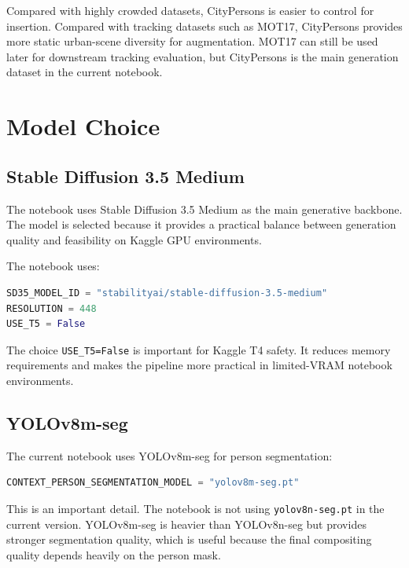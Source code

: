 \documentclass[12pt,a4paper]{article}
\begin{document}
Compared with highly crowded datasets, CityPersons is easier to control for
insertion. Compared with tracking datasets such as MOT17, CityPersons provides
more static urban-scene diversity for augmentation. MOT17 can still be used
later for downstream tracking evaluation, but CityPersons is the main generation
dataset in the current notebook.

\section{Model Choice}

\subsection{Stable Diffusion 3.5 Medium}

The notebook uses Stable Diffusion 3.5 Medium as the main generative backbone.
The model is selected because it provides a practical balance between generation
quality and feasibility on Kaggle GPU environments.

The notebook uses:

\begin{lstlisting}[language=Python,caption={Current SD3.5 configuration}]
SD35_MODEL_ID = "stabilityai/stable-diffusion-3.5-medium"
RESOLUTION = 448
USE_T5 = False
\end{lstlisting}

The choice \texttt{USE\_T5=False} is important for Kaggle T4 safety. It reduces
memory requirements and makes the pipeline more practical in limited-VRAM
notebook environments.

\subsection{YOLOv8m-seg}

The current notebook uses YOLOv8m-seg for person segmentation:

\begin{lstlisting}[language=Python,caption={Current person segmentation model}]
CONTEXT_PERSON_SEGMENTATION_MODEL = "yolov8m-seg.pt"
\end{lstlisting}

This is an important detail. The notebook is not using \texttt{yolov8n-seg.pt}
in the current version. YOLOv8m-seg is heavier than YOLOv8n-seg but provides
stronger segmentation quality, which is useful because the final compositing
quality depends heavily on the person mask.
\end{document}
